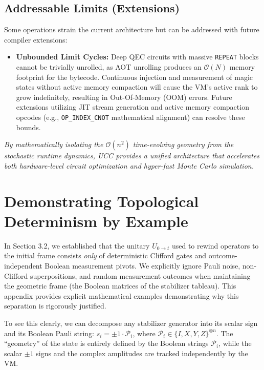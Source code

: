 \documentclass[11pt]{article}
\begin{document}
\subsection{Addressable Limits (Extensions)}
Some operations strain the current architecture but can be addressed with future compiler extensions:
\begin{itemize}
    \item \textbf{Unbounded Limit Cycles:} Deep QEC circuits with massive \texttt{REPEAT} blocks cannot be trivially unrolled, as AOT unrolling produces an $\mathcal{O}(N)$ memory footprint for the bytecode. Continuous injection and measurement of magic states without active memory compaction will cause the VM's active rank to grow indefinitely, resulting in Out-Of-Memory (OOM) errors. Future extensions utilizing JIT stream generation and active memory compaction opcodes (e.g., \texttt{OP\_INDEX\_CNOT} mathematical alignment) can resolve these bounds.
\end{itemize}

\vspace{0.5cm}
\begin{center}
\textit{By mathematically isolating the $\mathcal{O}(n^2)$ time-evolving geometry from the stochastic runtime dynamics, UCC provides a unified architecture that accelerates both hardware-level circuit optimization and hyper-fast Monte Carlo simulation.}
\end{center}

\newpage
\appendix
\section{Demonstrating Topological Determinism by Example}
\label{app:topological_determinism}

In Section 3.2, we established that the unitary $U_{0 \to t}$ used to rewind operators to the initial frame consists \textit{only} of deterministic Clifford gates and outcome-independent Boolean measurement pivots. We explicitly ignore Pauli noise, non-Clifford superpositions, and random measurement outcomes when maintaining the geometric frame (the Boolean matrices of the stabilizer tableau). This appendix provides explicit mathematical examples demonstrating why this separation is rigorously justified.

To see this clearly, we can decompose any stabilizer generator into its scalar sign and its Boolean Pauli string: $s_i = \pm 1 \cdot \mathcal{P}_i$, where $\mathcal{P}_i \in \{I, X, Y, Z\}^{\otimes n}$. The ``geometry'' of the state is entirely defined by the Boolean strings $\mathcal{P}_i$, while the scalar $\pm 1$ signs and the complex amplitudes are tracked independently by the VM.
\end{document}
